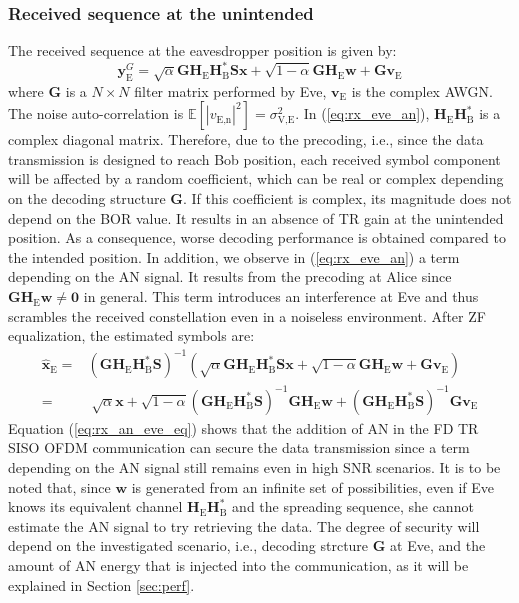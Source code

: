 \documentclass[journal,comsoc]{IEEEtran}
\newcommand{\EX}[1]{\mathbb{E} \left[#1\right]}%
\newcommand{\HE}{\textbf{H}_{\text{E}}}
\newcommand{\HB}{\textbf{H}_{\text{B}}}
\newcommand{\spread}{\textbf{S}}
\newcommand{\w}{\textbf{w}}
\begin{document}
\subsubsection{Received sequence at the unintended}
The received sequence at the eavesdropper position is given by:
\begin{equation}
\textbf{y}_{\text{E}}^G = \sqrt{\alpha}  \textbf{G} \HE \HB^* \spread\textbf{x} + \sqrt{1-\alpha} \textbf{G} \HE \w + \textbf{G}  \textbf{v}_\text{E}
\label{eq:rx_eve_an}
\end{equation}
where $\textbf{G}$ is a $N \times N$ filter matrix performed by Eve, $\textbf{v}_\text{E}$ is the complex AWGN. The noise auto-correlation is $\EX{|v_{\text{E,n}}|^2} = \sigma_{\text{V,E}}^2$.  In (\ref{eq:rx_eve_an}), $\HE \HB^*$ is a complex diagonal matrix. Therefore, due to the precoding, i.e., since the data transmission is designed to reach Bob position, each received symbol component will be affected by a random coefficient, which can be real or complex depending on the decoding structure $\textbf{G}$. If this coefficient is complex, its magnitude does not depend on the BOR value. It results in an absence of TR gain at the unintended position. As a consequence, worse decoding performance is obtained compared to the intended position. In addition, we observe in (\ref{eq:rx_eve_an}) a term depending on the AN signal. It results from the precoding at Alice since $\textbf{G}\HE \w \neq \textbf{0}$ in general. This term introduces an interference at Eve and thus scrambles the received constellation even in a noiseless environment. After ZF equalization, the estimated symbols are:
\begin{equation}
\begin{split}
\hat{\textbf{x}}_{\text{E}} =& \left(\textbf{G} \HE \HB^* \spread \right)^{-1}
\left( \sqrt{\alpha} \textbf{G} \HE \HB^* \spread \textbf{x} +   \sqrt{1-\alpha} \textbf{G} \HE \w  +  \textbf{G}  \textbf{v}_\text{E}  \right) \\
=& \;\sqrt{\alpha}\textbf{x} + \sqrt{1-\alpha} \left(\textbf{G} \HE \HB^* \spread \right)^{-1}  \textbf{G} \HE \w + \left(\textbf{G} \HE \HB^* \spread \right)^{-1}  \textbf{G} \textbf{v}_\text{E}
\end{split}
\label{eq:rx_an_eve_eq}
\end{equation}
Equation (\ref{eq:rx_an_eve_eq}) shows that the addition of AN in the FD TR SISO OFDM communication can secure the data transmission since a term depending on the AN signal still remains even in high SNR scenarios. It is to be noted that, since $\w$ is generated from an infinite set of possibilities, even if Eve knows its equivalent channel $\HE\HB^*$ and the spreading sequence, she cannot estimate the AN signal  to try retrieving the data.  The degree of security will depend on the investigated scenario, i.e., decoding strcture $\textbf{G}$ at Eve, and the amount of AN energy that is injected into the communication, as it will be explained in Section \ref{sec:perf}.
\end{document}
